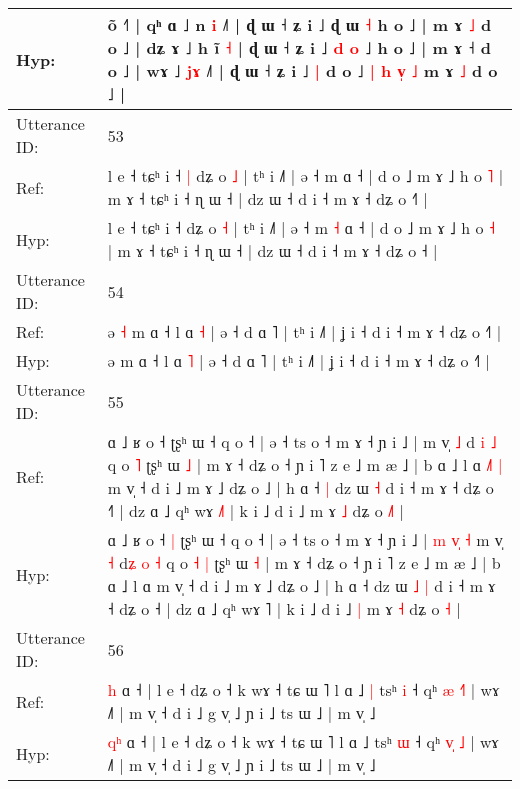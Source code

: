\documentclass[10pt]{article}
\DeclareRobustCommand{\hl}[1]{{\textcolor{red}{#1}}}
\begin{document}
\begin{longtable}{ll}
 \\
Hyp: & õ ˧˥ | qʰ ɑ ˩ n \hl{i} ˩˥ | ɖ ɯ ˧ ʑ i ˩ ɖ ɯ \hl{˧} h o ˩ | m ɤ \hl{˩} d o ˩ | dʑ ɤ ˩ h ĩ \hl{˧} | ɖ ɯ ˧ ʑ i ˩ \hl{d} \hl{o} ˩ h o ˩ | m ɤ ˧ d o ˩ |\hl{}\hl{}\hl{} wɤ ˩\hl{}\hl{} \hl{j}\hl{ɤ} ˩˥ | ɖ ɯ ˧ ʑ i ˩\hl{ }\hl{|} d o ˩ \hl{|} \hl{h} \hl{v}\hl{̩} \hl{˩} m ɤ \hl{˩} d o ˩ |
 \\
\midrule
Utterance ID: & 53 \\
Ref: & l e ˧ tɕʰ i ˧\hl{ }\hl{|} dʑ o \hl{˩} | tʰ i ˩˥ | ə ˧ m\hl{}\hl{} ɑ ˧ | d o ˩ m ɤ ˩ h o \hl{˥} | m ɤ ˧ tɕʰ i ˧ ɳ ɯ ˧ | dz ɯ ˧ d i ˧ m ɤ ˧ dʑ o ˧\hl{˥} |
 \\
Hyp: & l e ˧ tɕʰ i ˧\hl{}\hl{} dʑ o \hl{˧} | tʰ i ˩˥ | ə ˧ m\hl{ }\hl{˧} ɑ ˧ | d o ˩ m ɤ ˩ h o \hl{˧} | m ɤ ˧ tɕʰ i ˧ ɳ ɯ ˧ | dz ɯ ˧ d i ˧ m ɤ ˧ dʑ o ˧\hl{} |
 \\
\midrule
Utterance ID: & 54 \\
Ref: & ə\hl{ }\hl{˧} m ɑ ˧ l ɑ \hl{˧} | ə ˧ d ɑ ˥ | tʰ i ˩˥ | ʝ i ˧ d i ˧ m ɤ ˧ dʑ o ˧˥ |
 \\
Hyp: & ə\hl{}\hl{} m ɑ ˧ l ɑ \hl{˥} | ə ˧ d ɑ ˥ | tʰ i ˩˥ | ʝ i ˧ d i ˧ m ɤ ˧ dʑ o ˧˥ |
 \\
\midrule
Utterance ID: & 55 \\
Ref: & ɑ ˩ ʁ o ˧\hl{}\hl{} ʈʂʰ ɯ ˧ q o ˧ | ə ˧ ts o ˧ m ɤ ˧ ɲ i ˩ |\hl{}\hl{}\hl{}\hl{}\hl{}\hl{}\hl{} m v̩ \hl{˩} d\hl{} \hl{i} \hl{˩} q o\hl{}\hl{} \hl{˥} ʈʂʰ ɯ \hl{˩} | m ɤ ˧ dʑ o ˧ ɲ i ˥ z e ˩ m æ ˩ | b ɑ ˩ l ɑ\hl{ }\hl{˩}\hl{˥}\hl{ }\hl{|} m v̩ ˧ d i ˩ m ɤ ˩ dʑ o ˩ | h ɑ ˧\hl{ }\hl{|} dz ɯ\hl{}\hl{} \hl{˧} d i ˧ m ɤ ˧ dʑ o ˧\hl{˥} | dz ɑ ˩ qʰ wɤ \hl{˩}˥ | k i ˩ d i ˩\hl{}\hl{} m ɤ \hl{˩} dʑ o \hl{˩}\hl{˥} |
 \\
Hyp: & ɑ ˩ ʁ o ˧\hl{ }\hl{|} ʈʂʰ ɯ ˧ q o ˧ | ə ˧ ts o ˧ m ɤ ˧ ɲ i ˩ |\hl{ }\hl{m}\hl{ }\hl{v}\hl{̩}\hl{ }\hl{˧} m v̩ \hl{˧} d\hl{ʑ} \hl{o} \hl{˧} q o\hl{ }\hl{˧} \hl{|} ʈʂʰ ɯ \hl{˧} | m ɤ ˧ dʑ o ˧ ɲ i ˥ z e ˩ m æ ˩ | b ɑ ˩ l ɑ\hl{}\hl{}\hl{}\hl{}\hl{} m v̩ ˧ d i ˩ m ɤ ˩ dʑ o ˩ | h ɑ ˧\hl{}\hl{} dz ɯ\hl{ }\hl{˩} \hl{|} d i ˧ m ɤ ˧ dʑ o ˧\hl{} | dz ɑ ˩ qʰ wɤ \hl{}˥ | k i ˩ d i ˩\hl{ }\hl{|} m ɤ \hl{˧} dʑ o \hl{}\hl{˧} |
 \\
\midrule
Utterance ID: & 56 \\
Ref: & \hl{}\hl{h} ɑ ˧ | l e ˧ dʑ o ˧ k wɤ ˧ tɕ ɯ ˥ l ɑ ˩\hl{ }\hl{|} tsʰ \hl{i} ˧ qʰ \hl{æ}\hl{ }\hl{˧}\hl{˥} | wɤ ˩˥ | m v̩ ˧ d i ˩ g v̩ ˩ ɲ i ˩ ts ɯ ˩ | m v̩ ˩
 \\
Hyp: & \hl{q}\hl{ʰ} ɑ ˧ | l e ˧ dʑ o ˧ k wɤ ˧ tɕ ɯ ˥ l ɑ ˩\hl{}\hl{} tsʰ \hl{ɯ} ˧ qʰ \hl{v}\hl{̩}\hl{ }\hl{˩} | wɤ ˩˥ | m v̩ ˧ d i ˩ g v̩ ˩ ɲ i ˩ ts ɯ ˩ | m v̩ ˩

\end{longtable}
\end{document}
